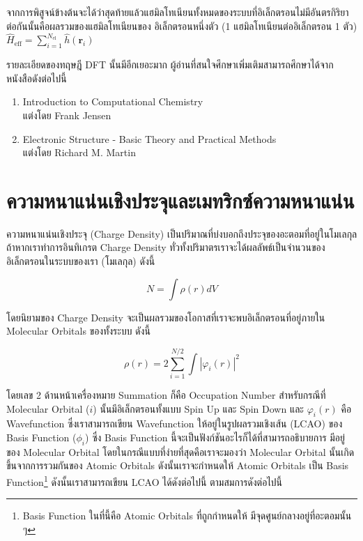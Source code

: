 จากการพิสูจน์ข้างต้นจะได้ว่าสุดท้ายแล้วแฮมิลโทเนียนทั้งหมดของระบบที่อิเล็กตรอนไม่มีอันตรกิริยาต่อกันนั้นคือผลรวมของแฮมิลโทเนียนของ%
อิเล็กตรอนหนึ่งตัว (1 แฮมิลโทเนียนต่ออิเล็กตรอน 1 ตัว) 
$\hat{H}_{\text{eff}} = \sum^{N_{\text{el}}}_{i=1} \hat{h}(\bm{r}_{i})$

รายละเอียดของทฤษฎี DFT นั้นมีอีกเยอะมาก ผู้อ่านที่สนใจศึกษาเพิ่มเติมสามารถศึกษาได้จากหนังสือดังต่อไปนี้

\begin{enumerate}[topsep=0pt]
    \item Introduction to Computational Chemistry \\ แต่งโดย Frank Jensen
    
    \item Electronic Structure - Basic Theory and Practical Methods \\ แต่งโดย Richard M. Martin
\end{enumerate}

\section{ความหนาแน่นเชิงประจุและเมทริกซ์ความหนาแน่น}
\label{sec:charge_den}

ความหนาแน่นเชิงประจุ (Charge Density) เป็นปริมาณที่บ่งบอกถึงประจุของอะตอมที่อยู่ในโมเลกุล ถ้าหากเราทำการอินทิเกรต Charge Density 
ทั่วทั้งปริมาตรเราจะได้ผลลัพธ์เป็นจำนวนของอิเล็กตรอนในระบบของเรา (โมเลกุล) ดังนี้\autocite{szabo1996}

\begin{equation}
    N = \int \rho (r) dV
\end{equation}

โดยนิยามของ Charge Density จะเป็นผลรวมของโอกาสที่เราจะพบอิเล็กตรอนที่อยู่ภายใน Molecular Orbitals ของทั้งระบบ ดังนี้

\begin{equation}\label{eq:charge_density}
    \rho (r) = 2 \sum^{N/2}_{i=1} \int |\varphi_{i}(r)|^{2}
\end{equation}

\noindent โดยเลข 2 ด้านหน้าเครื่องหมาย Summation ก็คือ Occupation Number สำหรับกรณีที่ Molecular Orbital ($i$) 
นั้นมีอิเล็กตรอนทั้งแบบ Spin Up และ Spin Down และ $\varphi_{i}(r)$ คือ Wavefunction ซึ่งเราสามารถเขียน Wavefunction 
ให้อยู่ในรูปผลรวมเชิงเส้น (LCAO) ของ Basis Function ($\phi_{i}$) ซึ่ง Basis Function นี้จะเป็นฟังก์ชันอะไรก็ได้ที่สามารถอธิบายการ%
มีอยู่ของ Molecular Orbital โดยในกรณีแบบที่ง่ายที่สุดคือเราจะมองว่า Molecular Orbital นั้นเกิดขึ้นจากการรวมกันของ Atomic Orbitals 
ดังนั้นเราจะกำหนดให้ Atomic Orbitals เป็น Basis Function\footnote{Basis Function ในที่นี้คือ Atomic Orbitals ที่ถูกกำหนดให้%
มีจุดศูนย์กลางอยู่ที่อะตอมนั้น ๆ} ดังนั้นเราสามารถเขียน LCAO ได้ดังต่อไปนี้ 
ตามสมการดังต่อไปนี้

